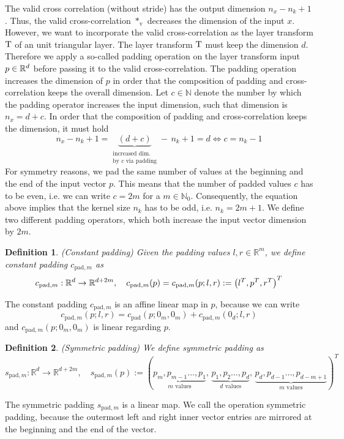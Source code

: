 \documentclass[twoside,a4paper]{article}
\newtheorem{definition}{Definition}
\begin{document}
The valid cross correlation (without stride) has the output dimension $n_x - n_k + 1$.
Thus, the valid cross-correlation $*_{\text{v}}$ decreases the dimension of the input $x$.
However, we want to incorporate the valid cross-correlation as the layer transform $\mathrm{T}$ of an
unit triangular layer. The layer transform $\mathrm{T}$ must keep the dimension $d$.
Therefore we apply a so-called padding operation on the layer transform input $p \in \mathbb{R}^d$ 
before passing it to the valid
cross-correlation. The padding operation increases the dimension of $p$ in order
that the composition of padding and cross-correlation keeps the overall dimension.
Let $c \in \mathbb{N}$ denote the number by which the padding operator increases 
the input dimension, such that dimension is $n_x = d+c$. 
In order that the composition of padding and cross-correlation keeps the dimension, it must hold
\begin{equation*}
	n_x - n_k + 1 = \underbrace{(d+c)}_{\substack{
		\text{increased dim.} \\
		\text{by } c \text{ via padding}
	}} - \, n_k + 1 = d \iff c = n_k-1
\end{equation*}
For symmetry reasons, we pad the same number of values at the beginning and 
the end of the input vector $p$. This means that the number of padded values $c$ has to be even,
i.e. we can write $c=2m$ for a $m \in \mathbb{N}_0$.
Consequently, the equation above implies that the kernel size $n_k$ has to be odd, i.e. 
$n_k = 2m+1$. We define two different padding operators,
which both increase the input vector dimension by $2m$.

\begin{definition}
	(Constant padding)
	Given the padding values $l,r \in \mathbb{R}^m$, we define constant padding 
	$c_{\text{pad},m}$ as
	\begin{equation*}
		c_{\text{pad},m} : \mathbb{R}^d \to \mathbb{R}^{d+2m},
		\quad c_{\text{pad},m}(p) = c_{\text{pad},m}(p;l,r) := \left( l^T, p^T, r^T \right)^T
	\end{equation*}
\end{definition}
The constant padding $c_{\text{pad},m}$ is an affine linear map in $p$, because we can write
\begin{equation}\label{cpad_affine}
	c_{\text{pad},m}(p;l,r) = c_{\text{pad}}(p;0_m,0_m)
	+ c_{\text{pad},m}(0_d;l,r)
\end{equation}
and $c_{\text{pad},m}(p;0_m,0_m)$ is linear regarding $p$.

\begin{definition}
	(Symmetric padding)
	We define symmetric padding as
	\begin{equation*}
		s_{\text{pad},m} : \mathbb{R}^d \to \mathbb{R}^{d+2m},
		\quad s_{\text{pad},m}(p) := (
			\underbrace{p_m, p_{m-1} \dots, p_1}_{m \text{ values}}, \,
			\underbrace{p_1, p_2 \dots, p_d}_{d \text{ values}}, \,
			\underbrace{p_d, p_{d-1} \dots, p_{d-m+1}}_{m \text{ values}}
		)^T
	\end{equation*}
\end{definition}
The symmetric padding $s_{\text{pad},m}$ is a linear map. We call the operation symmetric padding,
because the outermost left and right inner vector entries are mirrored at the beginning and the end
of the vector.
\end{document}
